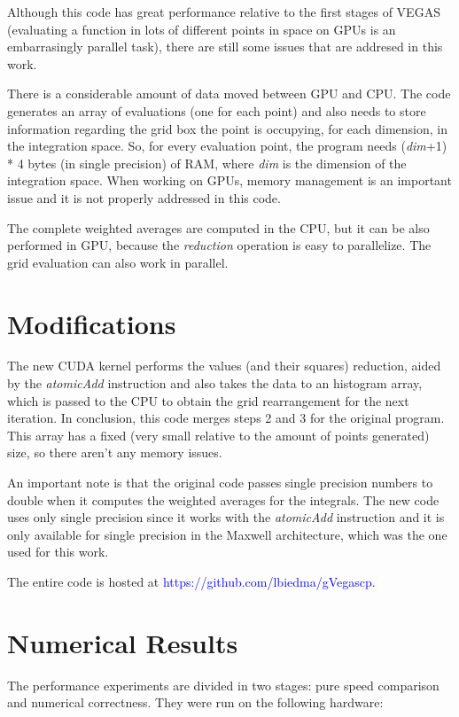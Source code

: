 \documentclass[english]{maciarticle}
\begin{document}
Although this code has great performance relative to the first stages of VEGAS (evaluating a function in lots of different points in space on GPUs is an embarrasingly parallel task), there are still some issues that are addresed in this work.

There is a considerable amount of data moved between GPU and CPU. The code generates an array of evaluations (one for each point) and also needs to store information regarding the grid box the point is occupying, for each dimension, in the integration space. So, for every evaluation point, the program needs (\textit{dim}+1) * 4 bytes (in single precision) of RAM, where \textit{dim} is the dimension of the integration space. When working on GPUs, memory management is an important issue and it is not properly addressed in this code.

The complete weighted averages are computed in the CPU, but it can be also performed in GPU, because the \textit{reduction} operation is easy to parallelize. The grid evaluation can also work in parallel.

\section{Modifications}

The new CUDA kernel performs the values (and their squares) reduction, aided by the \textit{atomicAdd} instruction\cite{cudaprog} and also takes the data to an histogram array, which is passed to the CPU to obtain the grid rearrangement for the next iteration. In conclusion, this code merges steps 2 and 3 for the original program.
This array has a fixed (very small relative to the amount of points generated) size,
so there aren't any memory issues.

An important note is that the original code passes single precision numbers to double when it computes the weighted averages for the integrals. The new code uses only single precision since it works with the \textit{atomicAdd} instruction and it is only available for single precision in the Maxwell architecture, which was the one used for this work.

The entire code is hosted at \textcolor{blue}{https://github.com/lbiedma/gVegascp}.

\section{Numerical Results}

The performance experiments are divided in two stages: pure speed comparison and numerical correctness. They were run on the following hardware:
\end{document}
